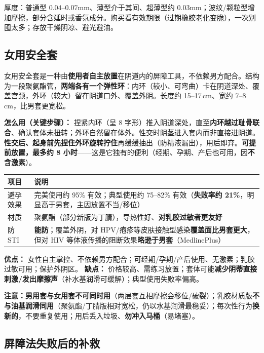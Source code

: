\documentclass[12pt,UTF8,openany]{ctexbook}
\begin{document}
\noindent 厚度：普通型 $0.04$--$0.07$mm、薄型介于其间、超薄型约 $0.03$mm；波纹/颗粒型增加摩擦，部分含延时或香氛成分。购买看有效期限（过期橡胶老化变脆），一次别囤太多；存放干燥阴凉、避光避油。

\subsection*{女用安全套}

女用安全套是一种由\textbf{使用者自主放置}在阴道内的屏障工具，不依赖男方配合。结构为一段聚氨酯管，\textbf{两端各有一个弹性环}：内环（较小、可弯曲）卡在阴道深处、覆盖宫颈，外环（较大）留在阴道口外、覆盖外阴。长度约 15--17\,cm、宽约 7--8\,cm，比男套更宽松。

\textbf{怎么用（关键步骤）：} 捏紧内环（呈 8 字形）推入阴道深处，直至\textbf{内环越过耻骨联合}、确认套体未扭转；外环自然留在体外。性交时阴茎进入套内而非直接进阴道。\textbf{性交后、起身前先捏住外环旋转拧住}再缓缓抽出（防精液漏出），用后即弃。\textbf{可提前放置，最多约 8 小时}——这是它独有的便利（经期、孕期、产后也可用，因\textbf{不含激素}）。

\begin{tabularx}{\textwidth}{l X}
\toprule
\textbf{项目} & \textbf{说明} \\
\midrule
避孕效果 & 完美使用约 95\% 有效；典型使用约 75--82\% 有效（\textbf{失败率约 21\%}，明显高于男套，主因放置不当/移位） \\
材质 & 聚氨酯（部分新版为丁腈），导热性好、\textbf{对乳胶过敏者更友好} \\
防 STI & \textbf{能防}；覆盖外阴，对 HPV/疱疹等皮肤接触型感染\textbf{覆盖面比男套更大}，但对 HIV 等体液传播的阻断效果\textbf{略逊于男套}（MedlinePlus） \\
\bottomrule
\end{tabularx}

\textbf{优点：} 女性自主掌控、不依赖男方配合；可经期/孕期/产后使用、无激素；乳胶过敏可用；保护外阴区。
\textbf{缺点：} 价格较高、需练习放置；套体可能\textbf{减少阴蒂直接刺激/发出摩擦声}（补水基润滑可缓解）；典型使用失败率偏高。

\textbf{注意：}\textbf{男用套与女用套不可同时用}（两层套互相摩擦会移位/破裂）；乳胶材质版\textbf{不与油基润滑同用}（聚氨酯/丁腈版相对宽松，仍以水基润滑最稳妥）；每次性行为\textbf{换新的}，不要重复使用；用后丢入垃圾、\textbf{勿冲入马桶}（易堵塞）。

\subsection*{屏障法失败后的补救}
\end{document}
